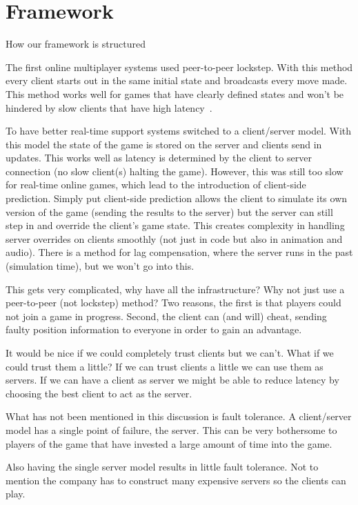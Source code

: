 
\section{Framework}
\label{sec:framework}

How our framework is structured

The first online multiplayer systems used peer-to-peer lockstep. With this method every client starts out in the same initial state and broadcasts every move made. This method works well for games that have clearly defined states and won’t be hindered by slow clients that have high latency~\cite{DOOMfaq}. 

To have better real-time support systems switched to a client/server model. With this model the state of the game is stored on the server and clients send in updates. This works well as latency is determined by the client to server connection (no slow client(s) halting the game). However, this was still too slow for real-time online games, which lead to the introduction of client-side prediction. Simply put client-side prediction allows the client to simulate its own version of the game (sending the results to the server) but the server can still step in and override the client's game state. This creates complexity in handling server overrides on clients smoothly (not just in code but also in animation and audio). There is a method for lag compensation, where the server runs in the past (simulation time), but we won’t go into this.

This gets very complicated, why have all the infrastructure? Why not just use a peer-to-peer (not lockstep) method? Two reasons, the first is that players could not join a game in progress. Second, the client can (and will) cheat, sending faulty position information to everyone in order to gain an advantage.

It would be nice if we could completely trust clients but we can’t. What if we could trust them a little? If we can trust clients a little we can use them as servers. If we can have a client as server we might be able to reduce latency by choosing the best client to act as the server.

What has not been mentioned in this discussion is fault tolerance. A client/server model has a single point of failure, the server. This can be very bothersome to players of the game that have invested a large amount of time into the game. 

Also having the single server model results in little fault tolerance. Not to mention the company has to construct many expensive servers so the clients can play.

